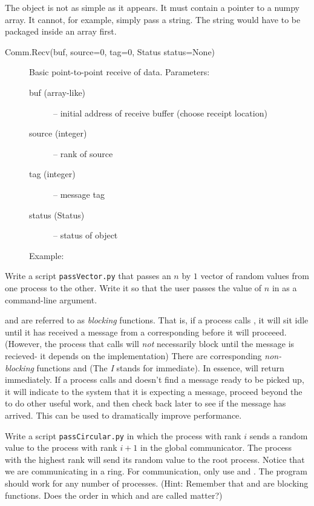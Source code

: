 The  object is not as simple as it appears. It must contain a pointer to a numpy array. It cannot, for example, simply pass a string. The string would have to be packaged inside an array first.

\begin{description}
\item[Comm.Recv(buf, source=0, tag=0, Status status=None)]
Basic point-to-point receive of data.
Parameters:
\begin{description}
\item[buf (array-like)] – initial address of receive buffer (choose receipt location)
\item[source (integer)] – rank of source
\item[tag (integer)] – message tag
\item[status (Status)] – status of object
\end{description}
Example:

\end{description}

\begin{problem}
Write a script \texttt{passVector.py} that passes an $n$ by $1$ vector of random values from one process to the other. Write it so that the user passes the value of $n$ in as a command-line argument.
\end{problem}

\begin{info}
 and  are referred to as \emph{blocking} functions. That is, if a process calls , it will sit idle until it has received a message from a corresponding  before it will proceeed. (However, the process that calls  will \emph{not} necessarily block until the message is recieved- it depends on the implementation) There are corresponding \emph{non-blocking} functions  and  (The \emph{I} stands for immediate). In essence,  will return immediately. If a process calls  and doesn't find a message ready to be picked up, it will indicate to the system that it is expecting a message, proceed beyond the  to do other useful work, and then check back later to see if the message has arrived. This can be used to dramatically improve performance.
\end{info}


\begin{problem}
Write a script \texttt{passCircular.py} in which the process with rank $i$ sends a random value to the process with rank $i+1$ in the global communicator. The process with the highest rank will send its random value to the root process. Notice that we are communicating in a ring. For communication, only use  and . The program should work for any number of processes. (Hint: Remember that  and  are blocking functions. Does the order in which  and  are called matter?)
\end{problem}

